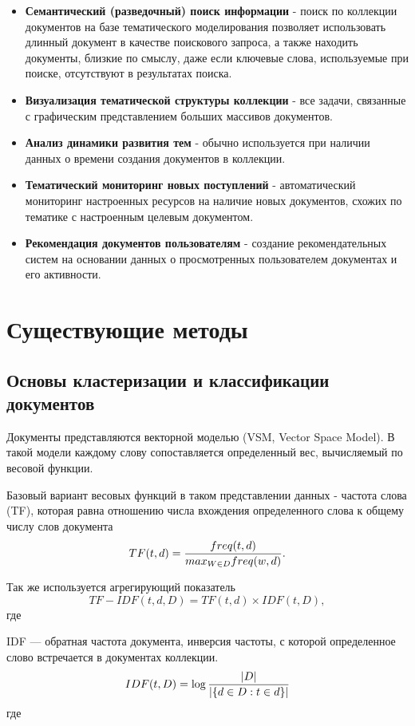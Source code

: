 \begin{itemize}
    \item \textbf{Семантический (разведочный) поиск информации} - поиск по коллекции документов на базе тематического моделирования позволяет использовать длинный документ в качестве поискового запроса, а также находить документы, близкие по смыслу, даже если ключевые слова, используемые при поиске, отсутствуют в результатах поиска.
    \item \textbf{Визуализация тематической структуры коллекции} - все задачи, связанные с графическим представлением больших массивов документов.
    \item \textbf{Анализ динамики развития тем} - обычно используется при наличии данных о времени создания документов в коллекции.
    \item \textbf{Тематический мониторинг новых поступлений} - автоматический мониторинг настроенных ресурсов на наличие новых документов, схожих по тематике с настроенным целевым документом.
    \item \textbf{Рекомендация документов пользователям} - создание рекомендательных систем на основании данных о просмотренных пользователем документах и его активности.
\end{itemize}

%
\section{Существующие методы}

\subsection{Основы кластеризации и классификации документов}

Документы представляются векторной моделью (VSM, Vector Space Model). В такой модели каждому слову сопоставляется определенный вес, вычисляемый по весовой функции.

Базовый вариант весовых функций в таком представлении данных - частота слова (TF), которая равна отношению числа вхождения определенного слова к общему числу слов документа
$$
TF(t,d)={{freq(t,d)}\over{max_{W \in D} freq(w,d)}}.
$$

Так же используется агрегирующий показатель
$$
TF-IDF(t,d,D)=TF(t,d) \times IDF(t,D),
$$
где

IDF — обратная частота документа, инверсия частоты, с которой определенное слово встречается в документах коллекции.
$$
IDF(t,D)=\log{{|D|}\over{|\{ d \in D:t \in d \}|}}
$$
где

